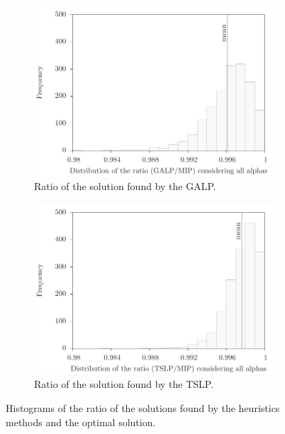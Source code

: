 \begin{figure}
  \begin{subfigure}{0.45\textwidth}
    \centering
    \includegraphics[scale=0.5, trim=1cm 0 0 0]{imgs/lpgavsmip.pdf}
    \caption{Ratio of the solution found by the GALP.}
    \label{fig:lpgavsmip}
  \end{subfigure}
  \qquad
  \begin{subfigure}{0.45\textwidth}
    \centering
    \includegraphics[scale=0.5, trim=1cm 0 0 0]{imgs/lptsvsmip.pdf}
    \caption{Ratio of the solution found by the TSLP.}
    \label{fig:lptsvsmip}
  \end{subfigure}
  \caption{Histograms of the ratio of the solutions found by the heuristics methods and the optimal solution.}
\end{figure}


